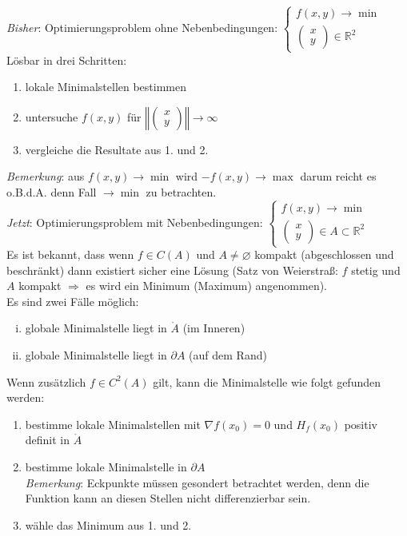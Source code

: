 \documentclass[11pt,a4paper]{book}
\newcommand {\R}	{\mathbb{R}}
\newcommand{\1}    	{\mathbbm{1}}
\newcommand{\Bemerkung}	{\noindent\textit{Bemerkung}: }
\begin{document}
\textit{Bisher}: Optimierungsproblem ohne Nebenbedingungen: \(\left\{ \begin{array}{l}
	f(x,y) \rightarrow \min \\
	\left(\begin{array}{c}
		x \\ y
	\end{array}\right) \in \R^2
\end{array}\right.\)\\
Lösbar in drei Schritten:
\begin{enumerate}[1.~]
	\item lokale Minimalstellen bestimmen
	\item untersuche \(f(x,y)\) für \(\left\Vert \left( \begin{array}{c}
		x \\ y	
	\end{array} \right) \right\Vert \rightarrow \infty\) 
	\item vergleiche die Resultate aus 1. und 2.
\end{enumerate}
\Bemerkung aus \(f(x,y) \rightarrow \min\) wird \(-f(x,y) \rightarrow \max\) darum reicht es o.B.d.A. denn Fall \(\rightarrow \min\) zu betrachten.\\

\noindent
\textit{Jetzt}: Optimierungsproblem mit Nebenbedingungen: \(\left\{ \begin{array}{l}
	f(x,y) \rightarrow \min \\
	\left(\begin{array}{c}
		x \\ y
	\end{array}\right) \in A \subset \R^2
\end{array}\right.\)\\
Es ist bekannt, dass wenn \(f \in C(A)\) und \(A \neq \varnothing\) kompakt (abgeschlossen und beschränkt) dann existiert sicher eine Lösung (Satz von Weierstraß: \(f\) stetig und \(A\) kompakt \(\Rightarrow\) es wird ein Minimum (Maximum) angenommen).\\

\noindent
Es sind zwei Fälle möglich:
\begin{enumerate}[(i)]
	\item globale Minimalstelle liegt in \(\mathring{A}\) (im Inneren)
	\item globale Minimalstelle liegt in \(\partial A\) (auf dem Rand)
\end{enumerate}
Wenn zusätzlich \(f \in C^2(A)\) gilt, kann die Minimalstelle wie folgt gefunden werden:
\begin{enumerate}[1.~]
	\item bestimme lokale Minimalstellen mit \(\nabla f(x_0) = 0\) und \(H_f(x_0)\) positiv definit in \(\mathring{A}\)
	\item bestimme lokale Minimalstelle in \(\partial A\)\\
	\Bemerkung Eckpunkte müssen gesondert betrachtet werden, denn die Funktion kann an diesen Stellen nicht differenzierbar sein.
	\item wähle das Minimum aus 1. und 2.
\end{enumerate}
\end{document}

